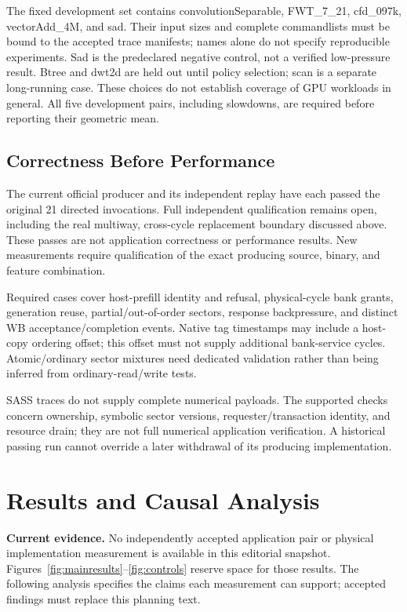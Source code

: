 \documentclass[conference,letterpaper]{IEEEtran}
\begin{document}
The fixed development set contains convolutionSeparable, FWT\_7\_21, cfd\_097k, vectorAdd\_4M, and sad. Their input sizes and complete commandlists must be bound to the accepted trace manifests; names alone do not specify reproducible experiments. Sad is the predeclared negative control, not a verified low-pressure result. Btree and dwt2d are held out until policy selection; scan is a separate long-running case. These choices do not establish coverage of GPU workloads in general. All five development pairs, including slowdowns, are required before reporting their geometric mean.

\subsection{Correctness Before Performance}
The current official producer and its independent replay have each passed the original 21 directed invocations. Full independent qualification remains open, including the real multiway, cross-cycle replacement boundary discussed above. These passes are not application correctness or performance results. New measurements require qualification of the exact producing source, binary, and feature combination.

Required cases cover host-prefill identity and refusal, physical-cycle bank grants, generation reuse, partial/out-of-order sectors, response backpressure, and distinct WB acceptance/completion events. Native tag timestamps may include a host-copy ordering offset; this offset must not supply additional bank-service cycles. Atomic/ordinary sector mixtures need dedicated validation rather than being inferred from ordinary-read/write tests.

SASS traces do not supply complete numerical payloads. The supported checks concern ownership, symbolic sector versions, requester/transaction identity, and resource drain; they are not full numerical application verification. A historical passing run cannot override a later withdrawal of its producing implementation.

\section{Results and Causal Analysis}
\noindent\textbf{Current evidence.} No independently accepted application pair or physical implementation measurement is available in this editorial snapshot. Figures~\ref{fig:mainresults}--\ref{fig:controls} reserve space for those results. The following analysis specifies the claims each measurement can support; accepted findings must replace this planning text.
\end{document}
